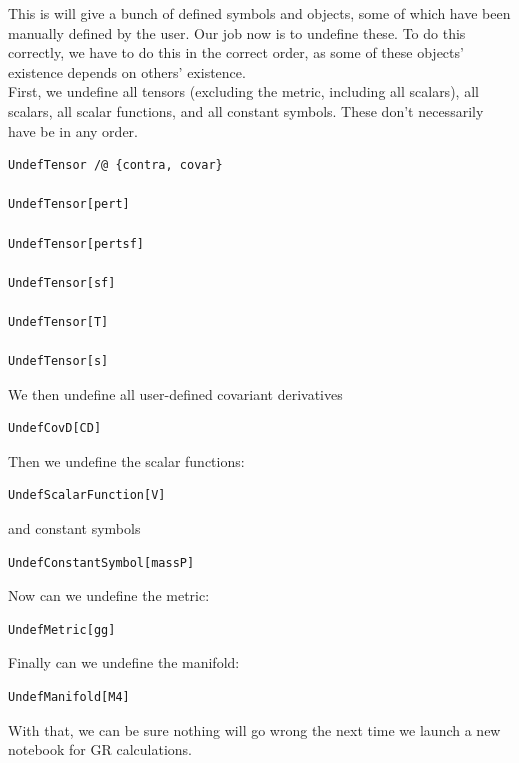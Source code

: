 \documentclass{book}
\theoremstyle{definition}
\begin{document}
This is will give a bunch of defined symbols and objects, some of which have been manually defined by the user. Our job now is to undefine these. To do this correctly, we have to do this in the correct order, as some of these objects' existence depends on others' existence. \\

First, we undefine all tensors (excluding the metric, including all scalars), all scalars, all scalar functions, and all constant symbols. These don't necessarily have be in any order.
\begin{lstlisting}
UndefTensor /@ {contra, covar}

UndefTensor[pert]

UndefTensor[pertsf]

UndefTensor[sf]

UndefTensor[T]

UndefTensor[s]
\end{lstlisting}

We then undefine all user-defined covariant derivatives
\begin{lstlisting}
UndefCovD[CD]
\end{lstlisting}

Then we undefine the scalar functions:
\begin{lstlisting}
UndefScalarFunction[V]
\end{lstlisting}
and constant symbols
\begin{lstlisting}
UndefConstantSymbol[massP]
\end{lstlisting}

Now can we undefine the metric:
\begin{lstlisting}
UndefMetric[gg]
\end{lstlisting}

Finally can we undefine the manifold:
\begin{lstlisting}
UndefManifold[M4]
\end{lstlisting}

With that, we can be sure nothing will go wrong the next time we launch a new notebook for GR calculations.\\
\end{document}

